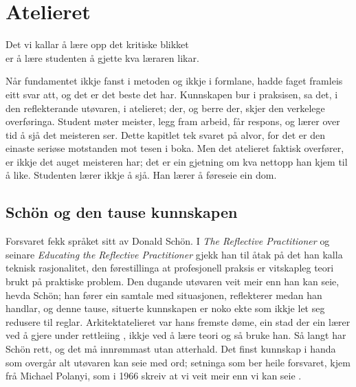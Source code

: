 \chapter{Atelieret}

\begin{motto}
Det vi kallar å lære opp det kritiske blikket\\ er å lære studenten å gjette kva læraren likar.
\end{motto}

Når fundamentet ikkje fanst i metoden og ikkje i formlane, hadde faget framleis eitt svar att, og det er det beste det har. Kunnskapen bur i praksisen, sa det, i den reflekterande utøvaren, i atelieret; der, og berre der, skjer den verkelege overføringa. Student møter meister, legg fram arbeid, får respons, og lærer over tid å sjå det meisteren ser. Dette kapitlet tek svaret på alvor, for det er den einaste seriøse motstanden mot tesen i boka. Men det atelieret faktisk overfører, er ikkje det auget meisteren har; det er ein gjetning om kva nettopp han kjem til å like. Studenten lærer ikkje å sjå. Han lærer å føreseie ein dom.


\section{Schön og den tause kunnskapen}

Forsvaret fekk språket sitt av Donald Schön. I \textit{The Reflective Practitioner} \autocite{schon1983} og seinare \textit{Educating the Reflective Practitioner} \autocite{schon1987educating} gjekk han til åtak på det han kalla teknisk rasjonalitet, den førestillinga at profesjonell praksis er vitskapleg teori brukt på praktiske problem. Den dugande utøvaren veit meir enn han kan seie, hevda Schön; han fører ein samtale med situasjonen, reflekterer medan han handlar, og denne tause, situerte kunnskapen er noko ekte som ikkje let seg redusere til reglar. Arkitektatelieret var hans fremste døme, ein stad der ein lærer ved å gjere under rettleiing \autocite{schon1992designing}, ikkje ved å lære teori og så bruke han. Så langt har Schön rett, og det må innrømmast utan atterhald. Det finst kunnskap i handa som overgår alt utøvaren kan seie med ord; setninga som ber heile forsvaret, kjem frå Michael Polanyi, som i 1966 skreiv at vi veit meir enn vi kan seie \autocite{polanyi1966tacit}.

